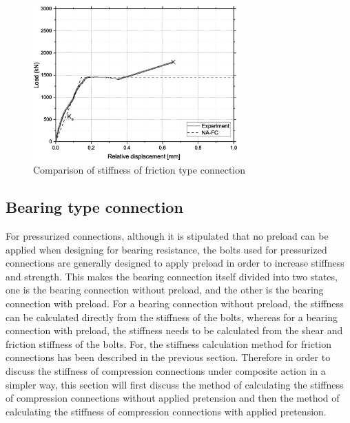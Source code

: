 \begin{figure}[htbp]
    \centering
    \includegraphics[width=0.7\textwidth]{imgs/ch7/NA-FC.eps}
    \caption{Comparison of stiffness of friction type connection}
    \label{fig-ks_compare}
\end{figure}

\subsection{Bearing type connection}


For pressurized connections, although it is stipulated that no preload can be applied when designing for bearing resistance, the bolts used for pressurized connections are generally designed to apply preload in order to increase stiffness and strength. This makes the bearing connection itself divided into two states, one is the bearing connection without preload, and the other is the bearing connection with preload. For a bearing connection without preload, the stiffness can be calculated directly from the stiffness of the bolts, whereas for a bearing connection with preload, the stiffness needs to be calculated from the shear and friction stiffness of the bolts. For, the stiffness calculation method for friction connections has been described in the previous section. Therefore in order to discuss the stiffness of compression connections under composite action in a simpler way, this section will first discuss the method of calculating the stiffness of compression connections without applied pretension and then the method of calculating the stiffness of compression connections with applied pretension.

